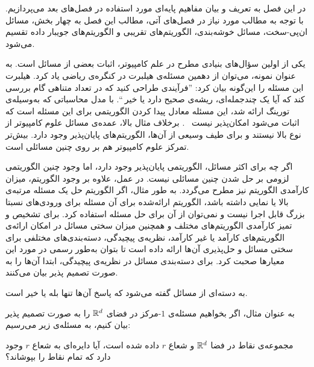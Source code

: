 

در این فصل به تعریف و بیان مفاهیم پایه‌ای مورد استفاده در فصل‌های بعد می‌پردازیم.
با توجه به مطالب مورد نیاز در فصل‌های آتی، مطالب این فصل به چهار بخش، مسائل ان‌پی-سخت، مسائل خوشه‌بندی، الگوریتم‌های تقریبی و الگوریتم‌های جویبار داده تقسیم می‌شود.


یکی از اولین سؤال‌های بنیادی مطرح در علم کامپیوتر، اثبات  بعضی از مسائل است.
به عنوان نمونه، می‌توان از دهمین مسئله‌ی هیلبرت در کنگره‌ی ریاضی یاد کرد.
هیلبرت این مسئله را این‌گونه بیان کرد:‌ ''فرآیندی طراحی کنید که در تعداد متناهی گام بررسی کند که آیا یک چندجمله‌ای، ریشه‌ی صحیح دارد یا خیر ``. 
با مدل محاسباتی که به‌وسیله‌ی تورینگ ارائه شد، این مسئله معادل پیدا کردن الگوریتمی برای این مسئله است که اثبات می‌شود امکان‌پذیر نیست ~.
برخلاف مثال بالا، عمده‌ی مسائل علوم کامپیوتر از نوع بالا نیستند و برای طیف وسیعی از آن‌ها، الگوریتم‌های پایان‌پذیر وجود دارد.
بیش‌تر تمرکز علوم کامپیوتر هم بر روی چنین مسائلی است.

اگر چه برای اکثر مسائل، الگوریتمی پایان‌پذیر وجود دارد، اما وجود چنین الگوریتمی لزومی بر حل شدن چنین مسائلی نیست.
در عمل، علاوه بر وجود الگوریتم، میزان کارآمدی الگوریتم نیز مطرح می‌گردد.
به طور مثال، اگر الگوریتم حل یک مسئله مرتبه‌ی بالا یا نمایی داشته باشد، الگوریتم ارائه‌شده برای آن مسئله برای ورودی‌های نسبتا بزرگ قابل اجرا نیست و نمی‌توان از آن برای حل مسئله استفاده کرد.
برای تشخیص و تمیز کارآمدی الگوریتم‌های مختلف و همچنین میزان سختی مسائل در امکان ارائه‌ی الگوریتم‌های کارآمد یا غیر کارآمد، نظریه‌ی پیچیدگی، دسته‌بندی‌های مختلفی برای سختی مسائل و حل‌پذیری آن‌ها ارائه داده است تا بتوان به‌طور رسمی در مورد این معیارها صحبت کرد.
برای دسته‌بندی مسائل در نظریه‌ی پیچیدگی، ابتدا آن‌ها را به صورت تصمیم پذیر بیان می‌کنند.


 به دسته‌ای از مسائل گفته می‌شود که پاسخ آن‌ها تنها بله یا خیر است.


به عنوان مثال، اگر بخواهیم مسئله‌ی $1$-مرکز در فضای $\mathbb{R}^d$ را به صورت تصمیم پذیر بیان کنیم، به مسئله‌ی زیر می‌رسیم:


 مجموعه‌ی نقاط در فضا $\mathbb{R}^d$ و شعاع $r$ داده شده است، آیا دایره‌ای به شعاع $r$ وجود دارد که تمام نقاط را بپوشاند؟

